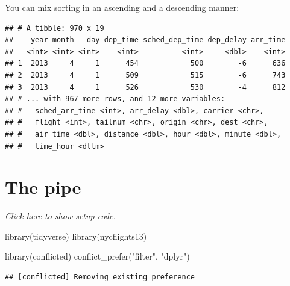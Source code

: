\documentclass[]{book}
\newenvironment{Shaded}{}{}
\newcommand{\DecValTok}[1]{#1}
\newcommand{\KeywordTok}[1]{\textcolor[rgb]{0.00,0.00,1.00}{#1}}
\newcommand{\NormalTok}[1]{#1}
\newcommand{\OperatorTok}[1]{#1}
\newcommand{\StringTok}[1]{\textcolor[rgb]{0.00,0.50,0.50}{#1}}
\begin{document}
You can mix sorting in an ascending and a descending manner:

\begin{Shaded}
\end{Shaded}

\begin{verbatim}
## # A tibble: 970 x 19
##    year month   day dep_time sched_dep_time dep_delay arr_time
##   <int> <int> <int>    <int>          <int>     <dbl>    <int>
## 1  2013     4     1      454            500        -6      636
## 2  2013     4     1      509            515        -6      743
## 3  2013     4     1      526            530        -4      812
## # ... with 967 more rows, and 12 more variables:
## #   sched_arr_time <int>, arr_delay <dbl>, carrier <chr>,
## #   flight <int>, tailnum <chr>, origin <chr>, dest <chr>,
## #   air_time <dbl>, distance <dbl>, hour <dbl>, minute <dbl>,
## #   time_hour <dttm>
\end{verbatim}

\hypertarget{the-pipe}{%
\section{The pipe}\label{the-pipe}}

\emph{Click here to show setup code.}

\begin{Shaded}
\begin{Highlighting}[]
\KeywordTok{library}\NormalTok{(tidyverse)}
\KeywordTok{library}\NormalTok{(nycflights13)}

\KeywordTok{library}\NormalTok{(conflicted)}
\KeywordTok{conflict_prefer}\NormalTok{(}\StringTok{"filter"}\NormalTok{, }\StringTok{"dplyr"}\NormalTok{)}
\end{Highlighting}
\end{Shaded}

\begin{verbatim}
## [conflicted] Removing existing preference
\end{verbatim}
\end{document}
